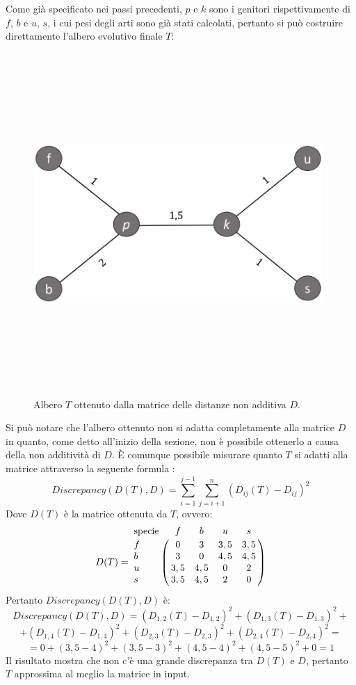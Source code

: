 \newline
Come già specificato nei passi precedenti, $p$ e $k$ sono i genitori rispettivamente di $f$, $b$ e $u$, $s$, i cui pesi degli arti sono già stati calcolati, pertanto si può costruire direttamente l'albero evolutivo finale $T$:
\begin{figure}[h!]
\centering
	\includegraphics[height=13cm, width=11cm, keepaspectratio]{neighbor_joining_2.jpg}
 	\caption{Albero $T$ ottenuto dalla matrice delle distanze non additiva $D$.}
  	\label{fig:neighbor_joining_2}
\end{figure}
\newline
Si può notare che l'albero ottenuto non si adatta completamente alla matrice $D$ in quanto, come detto all'inizio della sezione, non è possibile ottenerlo a causa della non additività di $D$. \`E comunque possibile misurare quanto $T$ si adatti alla matrice attraverso la seguente formula \cite{understandingBioinf}:
\[Discrepancy(D(T),D)=\sum_{i=1}^{j-1}\sum_{j=i+1}^{n}(D_{ij}(T)-D_{ij})^2\]
Dove $D(T)$ è la matrice ottenuta da $T$, ovvero:
\[
D(T) = \bordermatrix{\text{specie}&f&b&u&s\cr
                f& 0 & 3 & 3,5 & 3,5\cr
                b& 3 & 0 & 4,5 & 4,5\cr
                u& 3,5 & 4,5 & 0 & 2\cr
                s& 3,5 & 4,5 & 2 & 0}
\]
Pertanto $Discrepancy(D(T),D)$ è:
\[Discrepancy(D(T),D)=(D_{1,2}(T)-D_{1,2})^2+(D_{1,3}(T)-D_{1,3})^2+\]
\[+(D_{1,4}(T)-D_{1,4})^2+(D_{2,3}(T)-D_{2,3})^2+(D_{2,4}(T)-D_{2,4})^2=\]
\[=0+(3,5-4)^2+(3,5-3)^2+(4,5-4)^2+(4,5-5)^2+0=1\]
Il risultato mostra che non c'è una grande discrepanza tra $D(T)$ e $D$, pertanto $T$ approssima al meglio la matrice in input.



